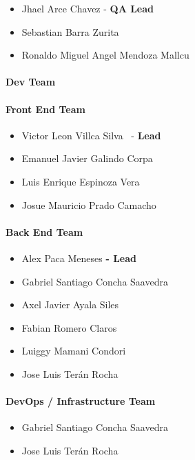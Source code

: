 \begin{itemize}
\tightlist
\item
  Jhael Arce Chavez - \textbf{QA Lead}
\item
  Sebastian Barra Zurita
\item
  Ronaldo Miguel Angel Mendoza Mallcu
\end{itemize}

\hypertarget{devteam-1}{
\paragraph{\texorpdfstring{\textbf{Dev
Team}}{Dev Team}}\label{devteam-1}}

\paragraph{Front End Team}\label{front-end-team-1}

\begin{itemize}
\tightlist
\item
  Victor Leon Villca Silva ~- \textbf{Lead}
\item
  Emanuel Javier Galindo Corpa
\item
  Luis Enrique Espinoza Vera
\item
  Josue Mauricio Prado Camacho
\end{itemize}

\paragraph{Back End Team}\label{back-end-team-1}

\begin{itemize}
\tightlist
\item
  Alex Paca Meneses \textbf{- Lead}
\item
  Gabriel Santiago Concha Saavedra
\item
  Axel Javier Ayala Siles
\item
  Fabian Romero Claros
\item
  Luiggy Mamani Condori
\item
  Jose Luis Terán Rocha
\end{itemize}

\paragraph{DevOps / Infrastructure Team}\label{devops-team-1}

\begin{itemize}
\tightlist
\item
  Gabriel Santiago Concha Saavedra
\item
  Jose Luis Terán Rocha
\end{itemize}

